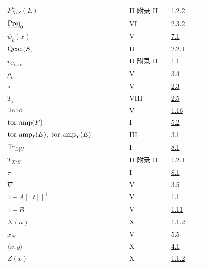 \begin{longtable}{@{}>{\raggedright\arraybackslash}p{0.50\linewidth}>{\raggedright\arraybackslash}p{0.17\linewidth}>{\raggedright\arraybackslash}p{0.15\linewidth}@{}}
\(P^n_{X/S}(E)\) & II 附录 II & \hyperlink{sga6.e02.para.1-2-2}{1.2.2}\\
\(\underline{\operatorname{Proj}}_0\) & VI & \hyperlink{sga6.e06.para.2-3-2}{2.3.2}\\
\(\psi_k(x)\) & V & \hyperlink{sga6.e05.para.7-1}{7.1}\\
\(\operatorname{Qcoh}(S)\) & II & \hyperlink{sga6.e02.notation.2-2-1}{2.2.1}\\
\(r_{\mathcal O_{U\times V}}\) & II 附录 II & \hyperlink{sga6.e02.sec.1.1}{1.1}\\
\(\rho_t\) & V & \hyperlink{sga6.e05.para.3-4}{3.4}\\
\(\circ\) & V & \hyperlink{sga6.e05.para.2-3}{2.3}\\
\(T_f\) & VIII & \hyperlink{sga6.e08.cor.2-5}{2.5}\\
\(\operatorname{Todd}\) & V & \hyperlink{sga6.e05.para.1-16}{1.16}\\
\(\operatorname{tor.amp}(F)\) & I & \hyperlink{sga6.e01.def.5-2}{5.2}\\
\(\toramp_f(E),\ \toramp_Y(E)\) & III & \hyperlink{sga6.e03.def.3-1}{3.1}\\
\(\operatorname{Tr}_{E|U}\) & I & \hyperlink{sga6.e01.para.8-1}{8.1}\\
\(T_{X/S}\) & II 附录 II & \hyperlink{sga6.e02.para.1-2-1}{1.2.1}\\
\(\tau\) & I & \hyperlink{sga6.e01.para.8-1}{8.1}\\
\(\nabla\) & V & \hyperlink{sga6.e05.para.3-5}{3.5}\\
\(1+A[[t]]^+\) & V & \hyperlink{sga6.e05.para.1-1}{1.1}\\
\(1+\widehat B^+\) & V & \hyperlink{sga6.e05.para.1-11}{1.11}\\
\(X(n)\) & X & \hyperlink{sga6.e10.prop.1-1-2}{1.1.2}\\
\(x_N\) & V & \hyperlink{sga6.e05.para.5-5}{5.5}\\
\(\langle x,y\rangle\) & X & \hyperlink{sga6.e10.sec.4.1}{4.1}\\
\(Z(x)\) & X & \hyperlink{sga6.e10.prop.1-1-2}{1.1.2}\\
\bottomrule
\end{longtable}
\endgroup

